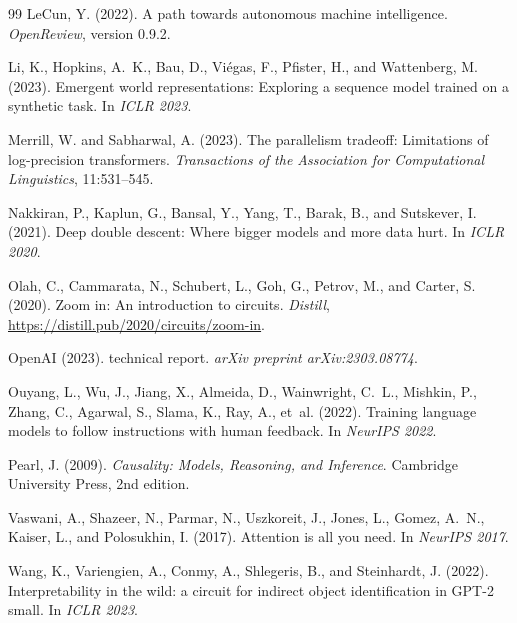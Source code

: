 \documentclass[10pt,twocolumn]{article}
\begin{document}
\begin{thebibliography}{99}
LeCun, Y. (2022).
\newblock A path towards autonomous machine intelligence.
\newblock \emph{OpenReview}, version 0.9.2.

Li, K., Hopkins, A.~K., Bau, D., Vi\'{e}gas, F., Pfister, H., and Wattenberg,
  M. (2023).
\newblock Emergent world representations: Exploring a sequence model trained on
  a synthetic task.
\newblock In \emph{ICLR 2023}.

Merrill, W. and Sabharwal, A. (2023).
\newblock The parallelism tradeoff: Limitations of log-precision transformers.
\newblock \emph{Transactions of the Association for Computational Linguistics},
  11:531--545.

Nakkiran, P., Kaplun, G., Bansal, Y., Yang, T., Barak, B., and Sutskever, I.
  (2021).
\newblock Deep double descent: Where bigger models and more data hurt.
\newblock In \emph{ICLR 2020}.

Olah, C., Cammarata, N., Schubert, L., Goh, G., Petrov, M., and Carter, S.
  (2020).
\newblock Zoom in: An introduction to circuits.
\newblock \emph{Distill}, \url{https://distill.pub/2020/circuits/zoom-in}.

OpenAI (2023).
 technical report.
\newblock \emph{arXiv preprint arXiv:2303.08774}.

Ouyang, L., Wu, J., Jiang, X., Almeida, D., Wainwright, C.~L., Mishkin, P.,
  Zhang, C., Agarwal, S., Slama, K., Ray, A., et~al. (2022).
\newblock Training language models to follow instructions with human feedback.
\newblock In \emph{NeurIPS 2022}.

Pearl, J. (2009).
\newblock \emph{Causality: Models, Reasoning, and Inference}.
\newblock Cambridge University Press, 2nd edition.

Vaswani, A., Shazeer, N., Parmar, N., Uszkoreit, J., Jones, L., Gomez,
  A.~N., Kaiser, L., and Polosukhin, I. (2017).
\newblock Attention is all you need.
\newblock In \emph{NeurIPS 2017}.

Wang, K., Variengien, A., Conmy, A., Shlegeris, B., and Steinhardt, J. (2022).
\newblock Interpretability in the wild: a circuit for indirect object
  identification in {GPT-2} small.
\newblock In \emph{ICLR 2023}.


\end{thebibliography}
\end{document}
